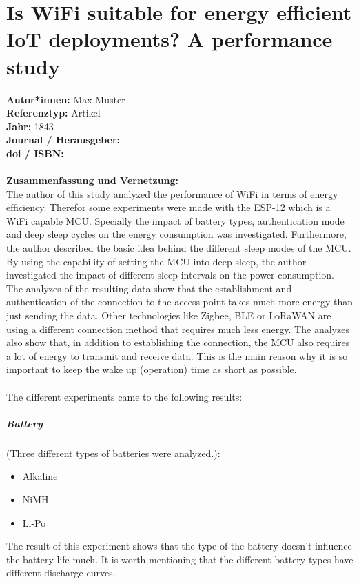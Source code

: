 \documentclass{report}
\begin{document}
{\let\clearpage\relax \chapter{Is WiFi suitable for energy efficient IoT deployments? A performance study}}
\noindent
\textbf{Autor*innen:} Max Muster\\
\textbf{Referenztyp:} Artikel\\
\textbf{Jahr:} 1843\\
\textbf{Journal / Herausgeber:}\\
\textbf{doi / ISBN:}\\\\
\textbf{Zusammenfassung und Vernetzung:}\\
The author of this study analyzed the performance of WiFi in terms of energy efficiency.
Therefor some experiments were made with the ESP-12 which is a WiFi capable MCU.
Specially the impact of battery types, authentication mode and deep sleep cycles on the energy consumption was investigated.
Furthermore, the author described the basic idea behind the different sleep modes of the MCU.
By using the capability of setting the MCU into deep sleep, the author investigated the impact of different
sleep intervals on the power consumption. 
The analyzes of the resulting data show that the establishment and authentication of the connection to the access point takes much more
energy than just sending the data. Other technologies like Zigbee, BLE or LoRaWAN are using a different connection method that requires much less energy.
The analyzes also show that, in addition to establishing the connection, the MCU also requires a lot of energy to transmit and receive data.
This is the main reason why it is so important to keep the wake up (operation) time as short as possible.
\\
\\
The different experiments came to the following results:\\
\paragraph{Battery} (Three different types of batteries were analyzed.):
\begin{itemize}
    \item Alkaline
    \item NiMH
    \item Li-Po
\end{itemize}
The result of this experiment shows that the type of the battery doesn't influence the battery life much.
It is worth mentioning that the different battery types have different discharge curves.
\end{document}
